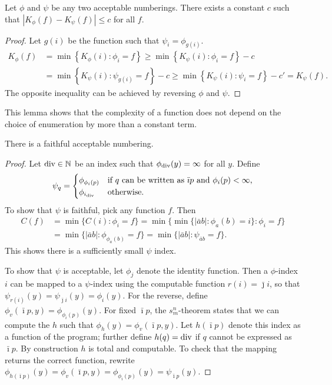 \documentclass{style/llncs}
\newcommand{\N}{\mathbb N}
\newcommand{\tn}[1]{\textnormal{#1}}
\begin{document}
\begin{lemma}
Let $\phi$ and $\psi$ be any two acceptable numberings. There exists a constant $c$ such that $\left| K_\phi(f) - K_\psi(f)\right | \leq c$ for all $f$. \label{lemma:invariance}
\end{lemma}
\begin{proof}
Let $g(i)$ be the function such that $\psi_i=\phi_{g(i)}$.
\begin{align*}
K_\phi(f) &= \min\left\{ K_\phi(i) : \phi_i= f\right\} 
\geq \min\left\{ K_\psi(i) : \phi_i= f\right\} - c\\
&= \min\left\{ K_\psi(i) : \psi_{g(i)}= f\right\} - c
\geq \min\left\{ K_\psi(i) : \psi_i= f\right\} - c' = K_\psi(f).
\end{align*}
The opposite inequality can be achieved by reversing $\phi$ and $\psi$. 
\end{proof}
This lemma shows that the complexity of a function does not depend on the choice of
enumeration by more than a constant term.

\begin{lemma}
  There is a faithful acceptable numbering.\label{lemma:faithful-numberings}
\end{lemma}
\begin{proof}
Let $\tn{div} \in \N$ be an index such that $\phi_{\tn{div}}(y)=\infty$ for all $y$. Define
  \[\psi_q=\begin{cases}
    \phi_{\phi_i(p)}&\tn{if $q$ can be written as $\bar\imath p$ and $\phi_i(p)<\infty$,}\\
    \phi_{i_\tn{div}}&\tn{otherwise.}\end{cases}
  \]
  To show that $\psi$ is faithful, pick any function $f$. Then
\[\begin{split}
C(f)&=\min\{C(i):\phi_i=f\} =\min\{\min\{|\bar a b|:\phi_a(b)=i\}:\phi_i=f\} \\
& =\min\{|\bar a b|:\phi_{\phi_a(b)}=f\}
 =\min\{|\bar a b|:\psi_{\bar a b}=f\}.
\end{split}\]
This shows there is a sufficiently small $\psi$ index.

To show that $\psi$ is acceptable, let $\phi_j$ denote the identity
function. Then a $\phi$-index $i$ can be mapped to a $\psi$-index
using the computable function $r(i)=\bar\jmath i$, so that
$\psi_{r(i)}(y)=\psi_{\bar\jmath i}(y)=\phi_i(y)$. For the reverse,
define $\phi_v(\bar\imath p, y)=\phi_{\phi_i(p)}(y)$. For fixed
$\bar\imath p$, the 
$s^n_m$-theorem \cite{kleene193notation} states that we can compute the $h$
such that $\phi_h(y)=\phi_v(\bar\imath p,y)$. Let $h(\bar\imath p)$
denote this index as a function of the program; further define
$h(q)=\tn{div}$ if $q$ cannot be expressed as $\bar\imath p$. By
construction $h$ is total and computable. To check that the mapping
returns the correct function, rewrite $\phi_{h(\bar\imath
  p)}(y)=\phi_v(\bar\imath p,y)=\phi_{\phi_i(p)}(y)=\psi_{\bar\imath p}(y)$.
\end{proof}
\end{document}
